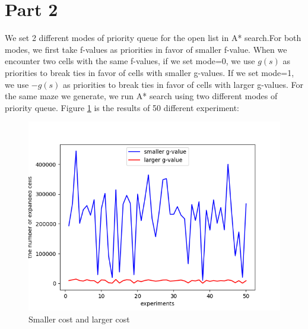 \documentclass[11pt]{article}
\begin{document}

\section*{Part 2}



We set 2 different modes of priority queue for the open list in A* search.For both modes, we first take f-values as priorities in favor of smaller f-value. When we encounter two cells with the same f-values, if we set mode=0,  we use $g(s)$ as priorities to break ties in favor of cells with smaller g-values. If we set mode=1, we use $-g(s)$ as priorities to break ties in favor of cells with larger g-values. For the same maze we generate, we run A* search using two different modes of priority queue.  Figure \ref{fig:Fig2.S&L} is the results of 50 different experiment:

\begin{figure}[htb]
	\centering
	\includegraphics[scale = 0.3]{smaller_g_and_larger_g.png}
	\caption{Smaller cost and larger cost}
	\label{fig:Fig2.S&L}
\end{figure}
\end{document}
